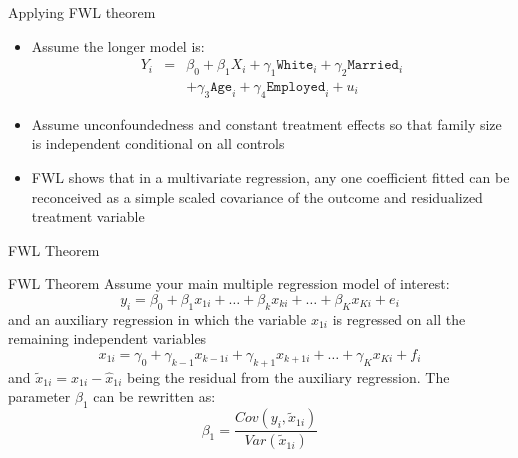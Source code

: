 \documentclass{beamer}
\begin{document}
\begin{frame}{Applying FWL theorem}
	
	\begin{itemize}
	\item Assume the longer model is:
		\begin{eqnarray*}
Y_i &=& \beta_0 + \beta_1 X_i + \gamma_1 \texttt{White}_i + \gamma_2 \texttt{Married}_i \\
		& & + \gamma_3 \texttt{Age}_i + \gamma_4 \texttt{Employed}_i + u_i
		\end{eqnarray*}
	\item Assume unconfoundedness and constant treatment effects so that family size is independent conditional on all controls
	\item FWL shows that in a multivariate regression, any one coefficient fitted can be reconceived as a simple scaled covariance of the outcome and residualized treatment variable
	\end{itemize}
	
\end{frame}




		

\begin{frame}{FWL Theorem}

	\begin{block}{FWL Theorem }
	Assume your main multiple regression model of interest:$$y_i=\beta_0 + \beta_1x_{1i} + \dots + \beta_kx_{ki} + \dots + \beta_Kx_{Ki} + e_i$$ and an auxiliary regression in which the variable $x_{1i}$ is regressed on all the remaining independent variables$$x_{1i} = \gamma_0 + \gamma_{k-1}x_{k-1 i}+\gamma_{k+1}x_{k+1 i} + \dots + \gamma_Kx_{Ki}+f_i$$and $\tilde{x}_{1i} = x_{1i} - \widehat{x}_{1i}$ being the residual from the auxiliary regression. The parameter $\beta_1$ can be rewritten as:$$\beta_1=\frac{Cov(y_i,\tilde{x}_{1i})}{Var(\tilde{x}_{1i})}$$

	\end{block}

\end{frame}
\end{document}
